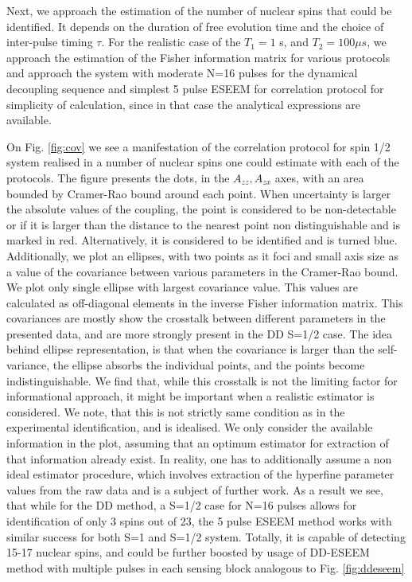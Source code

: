 \documentclass[%
 reprint,
superscriptaddress,
 amsmath,amssymb,
 aps,
]{revtex4-2}
\begin{document}
Next, we approach the estimation of the number of nuclear spins that could be identified. It depends on the duration of free evolution time and the choice of inter-pulse timing $\tau$. For the realistic case of the $T_1 = 1$ s, and $T_2 = 100 \mu s$, we approach the estimation of the Fisher information matrix for various protocols and approach the system with moderate N=16 pulses for the dynamical decoupling sequence and simplest 5 pulse ESEEM for correlation protocol for simplicity of calculation, since in that case the analytical expressions are available. 

On Fig. \ref{fig:cov} we see a manifestation of the correlation protocol for spin 1/2 system realised in a number of nuclear spins one could estimate with each of the protocols. 
The figure presents the dots, in the $A_{zz}, A_{zx}$ axes, with an area bounded by Cramer-Rao bound around each point. 
When uncertainty is larger the absolute values of the coupling, the point is considered to be non-detectable or if it is larger than the distance to the nearest point non distinguishable and is marked in red.
Alternatively, it is considered to be identified and is turned blue. 
Additionally, we plot an ellipses, with two points as it foci and small axis size as a value of the covariance between various parameters in the Cramer-Rao bound. 
We plot only single ellipse with largest covariance value. 
This values are calculated as off-diagonal elements in the inverse Fisher information matrix. 
This covariances are mostly show the crosstalk between different parameters in the presented data, and are more strongly present in the DD S=1/2 case. 
The idea behind ellipse representation, is that when the covariance is larger than the self-variance, the ellipse absorbs the individual points, and the points become indistinguishable. 
We find that, while this crosstalk is not the limiting factor for informational approach, it might be important when a realistic estimator is considered. 
We note, that this is not strictly same condition as in the experimental identification, and is idealised. 
We only consider the available information in the plot, assuming that an optimum estimator for extraction of that information already exist. 
In reality, one has to additionally assume a non ideal estimator procedure, which involves extraction of the hyperfine parameter values from the raw data and is a subject of further work.
As a result we see, that while for the DD method, a S=1/2 case for N=16 pulses allows for identification of only 3 spins out of 23, the 5 pulse ESEEM method works with similar success for both S=1 and S=1/2 system. 
Totally, it is capable of detecting 15-17 nuclear spins, and could be further boosted by usage of DD-ESEEM method with multiple pulses in each sensing block analogous to Fig. \ref{fig:ddeseem}
\end{document}
